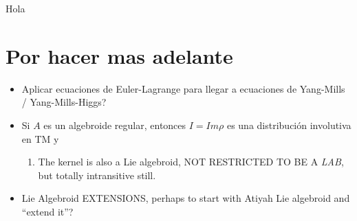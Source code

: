 Hola \cite{Reyes2013}

\section{Por hacer mas adelante}
\begin{itemize}
    \item Aplicar ecuaciones de Euler-Lagrange para llegar a ecuaciones de Yang-Mills / Yang-Mills-Higgs?
    
    \item Si $A$ es un algebroide regular, entonces $I = Im \rho$ es una distribución involutiva en TM y 
    
    \begin{enumerate}
        \item The kernel is also a Lie algebroid, NOT RESTRICTED TO BE A \emph{LAB}, but totally intransitive still.
    \end{enumerate}
    
    
    \item Lie Algebroid EXTENSIONS, perhaps to start with Atiyah Lie algebroid and ``extend it''?
\end{itemize}